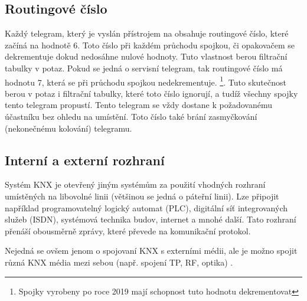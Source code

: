 \subsection{Routingové číslo}
Každý telegram, který je vyslán přístrojem na obsahuje routingové číslo, které začíná na hodnotě 6. Toto číslo při každém průchodu spojkou, či opakovačem se dekrementuje dokud nedosáhne nulové hodnoty. Tuto vlastnost berou filtrační tabulky v potaz.
Pokud se jedná o servisní telegram, tak routingové číslo má hodnotu 7, která se při průchodu spojkou nedekrementuje. \footnote{Spojky vyrobeny po roce 2019 mají schopnost tuto hodnotu dekrementovat}. Tuto skutečnost berou v potaz i filtrační tabulky, které toto číslo ignorují, a tudíž všechny spojky tento telegram propustí. Tento telegram se vždy dostane k požadovanému účastníku bez ohledu na umístění.
Toto číslo také brání zasmyčkování (nekonečnému kolování) telegramu. \cite{Topologie}
\subsection{Interní a externí rozhraní}
Systém KNX je otevřený jiným systémům za použití vhodných rozhraní umístěných na libovolné linii (většinou se jedná o páteřní linii). Lze připojit například programovatelný logický automat (PLC), digitální síť integrovaných služeb (ISDN), systémová technika budov, internet a mnohé další.
Tato rozhraní přenáší obousměrně zprávy, které převede na komunikační protokol.

Nejedná se ovšem jenom o spojovaní KNX s externími médii, ale je možno spojit různá KNX média mezi sebou (např. spojení TP, RF, optika) \cite{Topologie}.